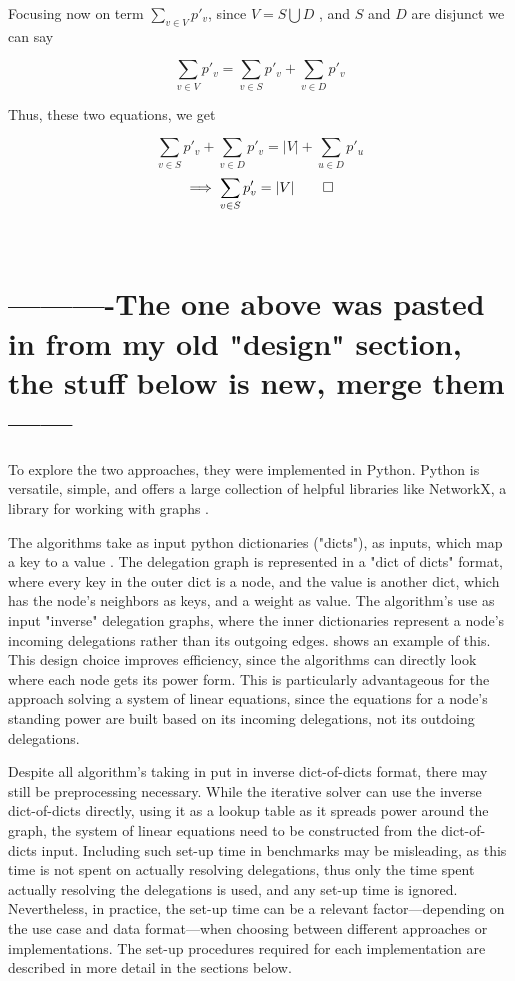 Focusing now on term $\sum_{v \in V} p'_v$, since $V = S \bigcup D$ , and $S$ and $D$ are disjunct we can say

\[
\sum_{v \in V} p'_v = \sum_{v \in S} p'_v  + \sum_{v \in D} p'_v 
\]

Thus, these two equations, we get

\[
\sum_{v \in S} p'_v  + \sum_{v \in D} p'_v  = |V| + \sum_{u \in D} p'_u
\]
\[
\implies \sum_{v \in S} p'_v   = |V| \qed
\]


\\

\section{----------The one above was pasted in from my old "design" section, the stuff below is new, merge them------}

To explore the two approaches, they were implemented in Python. Python is versatile, simple, and offers a large collection of helpful libraries like NetworkX, a library for working with graphs \cite{hagbergExploringNetworkStructure2008}. 

The algorithms take as input python dictionaries ("dicts"), as inputs, which map a key to a value \cite{pythonsoftwarefoundationPythonTutorialSection}. The delegation graph is represented in a "dict of dicts" format, where every key in the outer dict is a node, and the value is another dict, which has the node's neighbors as keys, and a weight as value. The algorithm's use as input "inverse" delegation graphs, where the inner dictionaries represent a node's incoming delegations rather than its outgoing edges.  shows an example of this. This design choice improves efficiency, since the algorithms can directly look where each node gets its power form. This is particularly advantageous for the approach solving a system of linear equations, since the equations for a node's standing power are built based on its incoming delegations, not its outdoing delegations.

Despite all algorithm's taking in put in inverse dict-of-dicts format, there may still be preprocessing necessary. While the iterative solver can use the inverse dict-of-dicts directly, using it as a lookup table as it spreads power around the graph, the system of linear equations need to be constructed from the dict-of-dicts input. Including such set-up time in benchmarks may be misleading, as this time is not spent on actually resolving delegations, thus only the time spent actually resolving the delegations is used, and any set-up time is ignored. Nevertheless, in practice, the set-up time can be a relevant factor—depending on the use case and data format—when choosing between different approaches or implementations. The set-up procedures required for each implementation are described in more detail in the sections below.

